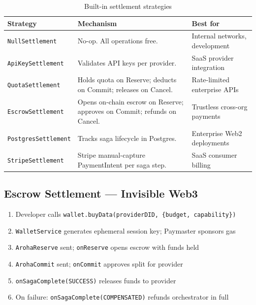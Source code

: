 \documentclass[11pt,a4paper]{article}
\begin{document}
\begin{table}[ht]
  \centering
  \renewcommand{\arraystretch}{1.4}
  \begin{tabularx}{\textwidth}{@{} l X X @{}}
    \toprule
    \textbf{Strategy} & \textbf{Mechanism} & \textbf{Best for} \\
    \midrule
    \texttt{NullSettlement}     & No-op. All operations free.
      & Internal networks, development \\
    \texttt{ApiKeySettlement}   & Validates API keys per provider.
      & SaaS provider integration \\
    \texttt{QuotaSettlement}    & Holds quota on Reserve; deducts on Commit; releases on Cancel.
      & Rate-limited enterprise APIs \\
    \texttt{EscrowSettlement}   & Opens on-chain escrow on Reserve; approves on Commit; refunds on Cancel.
      & Trustless cross-org payments \\
    \texttt{PostgresSettlement} & Tracks saga lifecycle in Postgres.
      & Enterprise Web2 deployments \\
    \texttt{StripeSettlement}   & Stripe manual-capture PaymentIntent per saga step.
      & SaaS consumer billing \\
    \bottomrule
  \end{tabularx}
  \caption{Built-in settlement strategies}
\end{table}

\subsection{Escrow Settlement --- Invisible Web3}

\begin{enumerate}[noitemsep]
  \item Developer calls \texttt{wallet.buyData(providerDID, \{budget, capability\})}
  \item \texttt{WalletService} generates ephemeral session key; Paymaster sponsors gas
  \item \texttt{ArohaReserve} sent; \texttt{onReserve} opens escrow with funds held
  \item \texttt{ArohaCommit} sent; \texttt{onCommit} approves split for provider
  \item \texttt{onSagaComplete(SUCCESS)} releases funds to provider
  \item On failure: \texttt{onSagaComplete(COMPENSATED)} refunds orchestrator in full
\end{enumerate}
\end{document}
